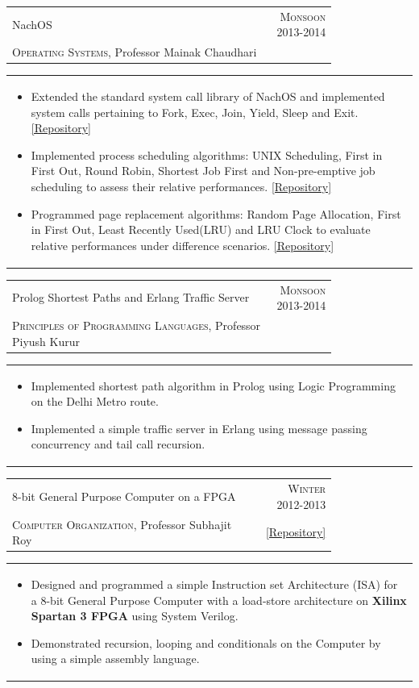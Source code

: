 \documentclass[a4paper]{article} %
\newcommand{\cproject}[5]{
    \begin{tabular}{p{0.80\linewidth}r}
        \textcolor{NavyBlue}{\small #2} & \multicolumn{1}{m{4cm}}{\raggedleft \small {\textsc{#1}}}\\
        \small {#3} & \small {#4}
    \end{tabular}
    \begin{tabular}{p{\linewidth}}
    \vspace{-0.3cm}
        \footnotesize {#5}
    \end{tabular}
    \vspace{-0.5cm}
}
\begin{document}
\cproject
    {Monsoon 2013-2014}
    {NachOS}
    {\textsc{Operating Systems}, Professor Mainak Chaudhari}
    {}
    {
     \begin{itemize}[leftmargin=0.5cm]
         \item Extended the standard system call library of NachOS and implemented system calls pertaining to Fork, Exec,
             Join, Yield, Sleep and Exit.
             \href{https://github.com/srijanshetty/nachos-syscalls/}{[Repository]}
         \item Implemented process scheduling algorithms: UNIX Scheduling, First in First Out,
             Round Robin, Shortest Job First and Non-pre-emptive job scheduling to assess their relative performances.
             \href{https://github.com/srijanshetty/nachos-scheduling}{[Repository]}
         \item Programmed page replacement algorithms: Random Page Allocation, First in First Out,
             Least Recently Used(LRU) and LRU Clock to evaluate relative performances under difference scenarios.
             \href{https://github.com/srijanshetty/nachos-final/}{[Repository]}
      \end{itemize}
    }

\cproject
    {Monsoon 2013-2014}
    {Prolog Shortest Paths and Erlang Traffic Server}
    {\textsc{Principles of Programming Languages}, Professor Piyush Kurur}
    {}
    {
       \begin{itemize}[leftmargin=0.5cm]
           \item Implemented shortest path algorithm in Prolog using Logic Programming on the Delhi Metro route.
           \item Implemented a simple traffic server in Erlang using message passing concurrency and tail call recursion.
       \end{itemize}
    }

\cproject
    {Winter 2012-2013}
    {8-bit General Purpose Computer on a FPGA}
    {\textsc{Computer Organization}, Professor Subhajit Roy}
    { \href{https://github.com/srijanshetty/220\_y11} {[Repository]} }
    {
      \begin{itemize}[leftmargin=0.5cm]
          \item Designed and programmed a simple Instruction set Architecture (ISA) for a 8-bit General Purpose Computer with a load-store
              architecture on \textbf{Xilinx Spartan 3 FPGA} using System Verilog.
          \item Demonstrated recursion, looping and conditionals on the Computer by using a simple assembly language.
      \end{itemize}
    }
\end{document}
